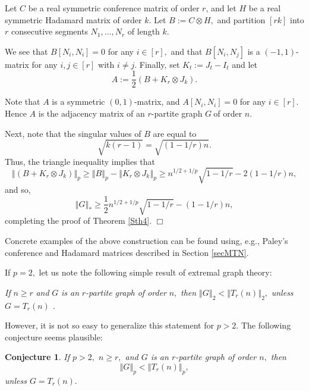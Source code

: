 \documentclass[12pt]{article}%
\newtheorem{conjecture}[theorem]{Conjecture}
\newenvironment{proof}[1][Proof]{\noindent{\textbf {#1}  }}  {\hfill$\Box$\bigskip}
\begin{document}
\begin{proof}
Let $C$ be a real symmetric conference matrix of order $r$, and let $H$ be a
real symmetric Hadamard matrix of order $k$. Let $B:=C\otimes H,$ and
partition $\left[  rk\right]  $ into $r$ consecutive segments $N_{1}%
,\ldots,N_{r}$ of length $k.$

We see that $B\left[  N_{i},N_{i}\right]  =0$ for any $i\in\left[  r\right]
,$ and that $B\left[  N_{i},N_{j}\right]  $ is a $\left(  -1,1\right)
$-matrix for any $i,j\in\left[  r\right]  $ with $i\neq j.$ Finally, set
$K_{t}:=J_{t}-I_{t}$ and let
\[
A:=\frac{1}{2}\left(  B+K_{r}\otimes J_{k}\right)  .
\]


Note that $A$ is a symmetric $\left(  0,1\right)  $-matrix, and $A\left[
N_{i},N_{i}\right]  =0$ for any $i\in\left[  r\right]  $. Hence $A$ is the
adjacency matrix of an $r$-partite graph $G\ $of order $n.$

Next, note that the singular values of $B$ are equal to
\[
\sqrt{k\left(  r-1\right)  }=\sqrt{\left(  1-1/r\right)  n}.
\]
Thus, the triangle inequality implies that
\[
\left\Vert \left(  B+K_{r}\otimes J_{k}\right)  \right\Vert _{p}\geq\left\Vert
B\right\Vert _{p}-\left\Vert K_{r}\otimes J_{k}\right\Vert _{p}\geq
n^{1/2+1/p}\sqrt{1-1/r}-2\left(  1-1/r\right)  n,
\]
and so,
\[
\left\Vert G\right\Vert _{\ast}\geq\frac{1}{2}n^{1/2+1/p}\sqrt{1-1/r}-\left(
1-1/r\right)  n,
\]
completing the proof of Theorem \ref{Sth4}.
\end{proof}

Concrete examples of the above construction can be found using, e.g., Paley's
conference and Hadamard matrices described in Section \ref{secMTN}.

If $p=2,$ let us note the following simple result of extremal graph
theory:\medskip

\emph{If }$n\geq r$\emph{ and }$G$\emph{ is an }$r$\emph{-partite graph of
order }$n,$\emph{ then} $\left\Vert G\right\Vert _{2}<\left\Vert T_{r}\left(
n\right)  \right\Vert _{2},$ \emph{unless }$G=T_{r}\left(  n\right)  $%
\emph{.}\medskip

However, it is not so easy to generalize this statement for $p>2.$ The
following conjecture seems plausible:

\begin{conjecture}
If $p>2,$ $n\geq r,$ and $G$ is an $r$-partite graph of order $n,$ then%
\[
\left\Vert G\right\Vert _{p}<\left\Vert T_{r}\left(  n\right)  \right\Vert
_{p},
\]
unless $G=T_{r}\left(  n\right)  .$
\end{conjecture}
\end{document}
